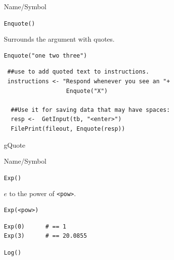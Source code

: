 \begin{desc}{Name/Symbol}
\item[Name/Symbol]	\verb+Enquote()+

\item[Description]	Surrounds the argument with quotes.  

\item[Usage]
\begin{verbatim}
Enquote("one two three")
\end{verbatim}

\item[Example]
\begin{verbatim}
 ##use to add quoted text to instructions.
 instructions <- "Respond whenever you see an "+ 
                  Enquote("X")

  ##Use it for saving data that may have spaces: 
  resp <-  GetInput(tb, "<enter>")
  FilePrint(fileout, Enquote(resp))

\end{verbatim}

\item[See Also]	
 gQuote 
\end{desc}





\begin{desc}{Name/Symbol}
\item[Name/Symbol]  	\verb+Exp()+

\item[Description]	$e$ to the power of \verb+<pow>+.

\item[Usage]
\begin{verbatim}
Exp(<pow>)
\end{verbatim}

\item[Example]
\begin{verbatim}
Exp(0) 		# == 1
Exp(3)		# == 20.0855
\end{verbatim}

\item[See Also]	\verb+Log()+
\end{desc}



